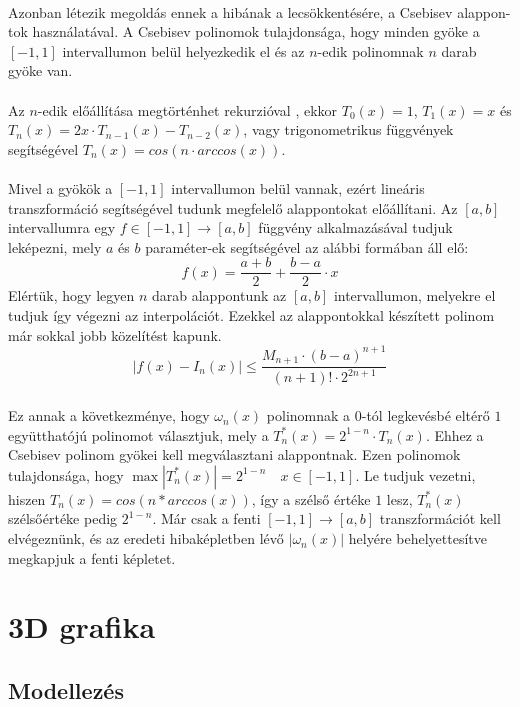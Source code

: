 \documentclass{elteikthesis}
\begin{document}
\paragraph{}
Azonban létezik megoldás ennek a hibának a lecsökkentésére, a Csebisev alappon-tok használatával. A Csebisev polinomok tulajdonsága, hogy minden gyöke a $[-1,1]$ intervallumon belül helyezkedik el és az $n$-edik polinomnak $n$ darab gyöke van.
\paragraph{}
Az $n$-edik előállítása megtörténhet rekurzióval , ekkor $T_0(x)=1$, $T_1(x) = x$ és $T_n(x) = 2x \cdot T_{n-1}(x)-T_{n-2}(x)$, vagy trigonometrikus függvények segítségével $T_n(x) = cos(n \cdot arccos(x))$.
\paragraph{}
Mivel a gyökök a $[-1, 1]$ intervallumon belül vannak, ezért lineáris transzformáció segítségével tudunk megfelelő alappontokat előállítani. Az $[a,b]$ intervallumra egy $f \in [-1,1] \rightarrow [a,b]$ függvény alkalmazásával tudjuk leképezni, mely $a$ és $b$ paraméter-ek segítségével az alábbi formában áll elő:
$$f(x) = \frac{a+b}{2}+\frac{b-a}{2} \cdot x$$
Elértük, hogy legyen $n$ darab alappontunk az $[a,b]$ intervallumon, melyekre el tudjuk így végezni az interpolációt. Ezekkel az alappontokkal készített polinom már sokkal jobb közelítést kapunk. $$|f(x)-I_n(x)| \leq \frac{M_{n+1}\cdot(b-a)^{n+1}}{(n+1)! \cdot 2^{2n+1}}$$
\paragraph{}
Ez annak a következménye, hogy $\omega_n(x)$ polinomnak a $0$-tól legkevésbé eltérő $1$ együtthatójú polinomot választjuk, mely a $T^*_n(x) = 2^{1-n} \cdot T_n(x)$. Ehhez a Csebisev polinom gyökei kell megválasztani alappontnak. Ezen polinomok tulajdonsága, hogy $\max |T^*_n(x)| = 2^{1-n} \quad x \in [-1,1]$. Le tudjuk vezetni, hiszen $T_n(x) = cos(n*arccos(x))$, így a szélső értéke $1$ lesz, $T^*_n(x)$ szélsőértéke pedig $2^{1-n}$.
Már csak a fenti $[-1,1] \rightarrow [a,b]$ transzformációt kell elvégeznünk, és az eredeti hibaképletben lévő $|\omega_n(x)|$ helyére behelyettesítve megkapjuk a fenti képletet.
\newpage
\section{3D grafika}
\subsection{Modellezés}
\end{document}
